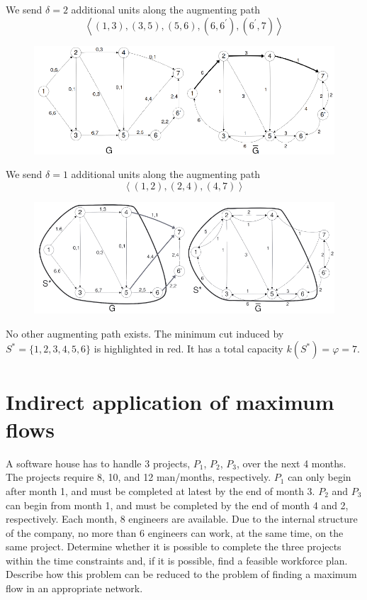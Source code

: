 \documentclass[12pt, a4paper]{report}
\begin{document}
        We send $\delta = 2$ additional units along the augmenting path \[\left\langle (1, 3),(3, 5),(5, 6),(6, 6^{'}),(6^{'}, 7)\right\rangle\]
        \begin{figure}[H]
            \centering
            \includegraphics[width=0.9\linewidth]{images/max3.png}
        \end{figure}
        We send $\delta = 1$ additional units along the augmenting path \[\left\langle (1, 2),(2, 4),(4, 7) \right\rangle\]
        \begin{figure}[H]
            \centering
            \includegraphics[width=0.9\linewidth]{images/max4.png}
        \end{figure}
        No other augmenting path exists. The minimum cut induced by $S^{*} = \{1, 2, 3, 4, 5, 6\}$ is highlighted in red. It has a total capacity $k(S^{*}) = \varphi = 7$.
  
    \newpage 

    \section{Indirect application of maximum flows}
        A software house has to handle 3 projects, $P_1$, $P_2$, $P_3$, over the next 4 months. The projects require 8, 10, and 12 man/months, respectively. $P_1$ can only 
        begin after month 1, and must be completed at latest by the end of month 3. $P_2$ and $P_3$ can begin from month 1, and must be completed by the end of month 4 and 
        2, respectively. Each month, 8 engineers are available. Due to the internal structure of the company, no more than 6 engineers can work, at the same time, on the 
        same project. Determine whether it is possible to complete the three projects within the time constraints and, if it is possible, find a feasible workforce plan. 
        Describe how this problem can be reduced to the problem of finding a maximum flow in an appropriate network.
\end{document}
